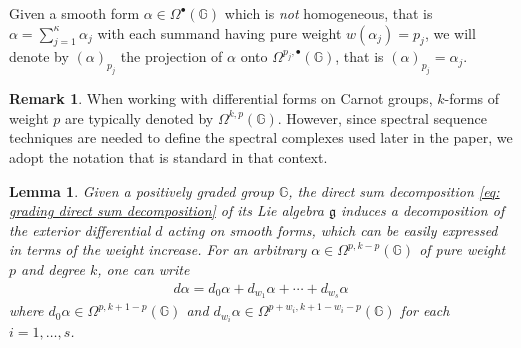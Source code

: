 \documentclass[dvipsnames]{amsart}
\newtheorem{lemma}[theorem]{Lemma}
\theoremstyle{definition}
\newtheorem{remark}[theorem]{Remark}
\theoremstyle{definition}
\numberwithin{equation}{section}
\newcommand{\G}{\mathbb{G}}
\begin{document}
 Given a smooth form $\alpha\in\Omega^\bullet(\G)$ which is \textit{not} homogeneous, that is $\alpha=\sum_{j=1}^{\kappa}\alpha_j$ with each summand having pure weight $w(\alpha_j)=p_j$, we will denote by $(\alpha)_{p_j}$ the projection of $\alpha$ onto $\Omega^{p_j,\bullet}(\G)$, that is $(\alpha)_{p_j}=\alpha_j$.

\begin{remark}
    When working with differential forms on Carnot groups, $k$-forms of weight $p$ are typically denoted by $\Omega^{k,p}(\G)$. However, since spectral sequence techniques are needed to define the spectral complexes used later in the paper, we adopt the notation that is standard in that context.
\end{remark}
\begin{lemma}\label{lem: diving exterior derivative}
    Given a {positively graded} group $\G$, the direct sum decomposition \eqref{eq: grading direct sum decomposition} of its Lie algebra $\mathfrak{g}$ induces a decomposition of the exterior differential $d$ acting on smooth forms, which can be easily expressed in terms of the weight increase. {For an arbitrary} $\alpha\in\Omega^{p,k-p}(\G)$ of pure weight $p$ and degree $k$, one can write
    \begin{align}\label{eq: decomposition of d}
        d\alpha=d_0\alpha+d_{w_1}\alpha+\cdots+d_{w_s}\alpha
    \end{align}
    where $d_0\alpha\in\Omega^{p,k+1-p}(\G)$ and $d_{w_i}\alpha\in\Omega^{p+w_i,k+1-w_i-p}(\G)$ for each $i=1,\ldots,s$.
\end{lemma}
\end{document}
